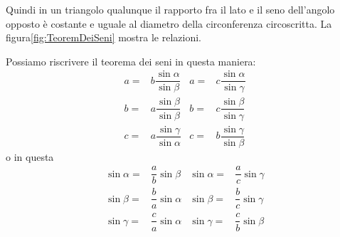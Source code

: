 Quindi in un triangolo qualunque il rapporto fra il lato e il seno dell'angolo opposto è costante e uguale al diametro della circonferenza circoscritta. La figura\nobs\vref{fig:TeoremDeiSeni} mostra le relazioni.

Possiamo riscrivere il teorema dei seni in questa maniera: 
\begin{align*}
a=&b\dfrac{\sin\alpha}{\sin\beta}& a=&c\dfrac{\sin\alpha}{\sin\gamma}\\
b=&a\dfrac{\sin\beta}{\sin\beta}& b=&c\dfrac{\sin\beta}{\sin\gamma}\\
c=&a\dfrac{\sin\gamma}{\sin\alpha}& c=&b\dfrac{\sin\gamma}{\sin\beta}
\end{align*}
o in questa
\begin{align*}
\sin\alpha=&\dfrac{a}{b}\sin\beta&\sin\alpha=&\dfrac{a}{c}\sin\gamma\\
\sin\beta=&\dfrac{b}{a}\sin\alpha&\sin\beta=&\dfrac{b}{c}\sin\gamma\\
\sin\gamma=&\dfrac{c}{a}\sin\alpha&\sin\gamma=&\dfrac{c}{b}\sin\beta\\
\end{align*}
